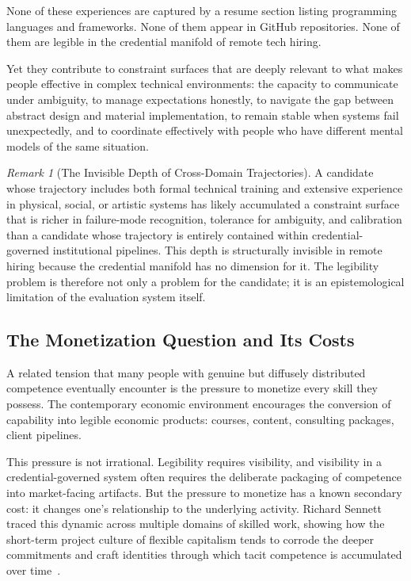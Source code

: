 \documentclass[12pt, a4paper]{article}
\theoremstyle{plain}
\theoremstyle{definition}
\theoremstyle{remark}
\newtheorem{remark}[proposition]{Remark}
\begin{document}
None of these experiences are captured by a resume section
listing programming languages and frameworks.
None of them appear in GitHub repositories.
None of them are legible in the credential manifold of remote tech hiring.

Yet they contribute to constraint surfaces that are deeply relevant
to what makes people effective in complex technical environments:
the capacity to communicate under ambiguity, to manage expectations honestly,
to navigate the gap between abstract design and material implementation,
to remain stable when systems fail unexpectedly, and to coordinate
effectively with people who have different mental models of the same situation.

\begin{remark}[The Invisible Depth of Cross-Domain Trajectories]
A candidate whose trajectory includes both formal technical training
and extensive experience in physical, social, or artistic systems
has likely accumulated a constraint surface that is richer in
failure-mode recognition, tolerance for ambiguity, and calibration
than a candidate whose trajectory is entirely contained within
credential-governed institutional pipelines.
This depth is structurally invisible in remote hiring because
the credential manifold has no dimension for it.
The legibility problem is therefore not only a problem for the candidate;
it is an epistemological limitation of the evaluation system itself.
\end{remark}

\subsection{The Monetization Question and Its Costs}

A related tension that many people with genuine but diffusely distributed competence
eventually encounter is the pressure to monetize every skill they possess.
The contemporary economic environment encourages the conversion of capability
into legible economic products: courses, content, consulting packages, client pipelines.

This pressure is not irrational. Legibility requires visibility,
and visibility in a credential-governed system often requires the deliberate
packaging of competence into market-facing artifacts.
But the pressure to monetize has a known secondary cost:
it changes one's relationship to the underlying activity.
Richard Sennett traced this dynamic across multiple domains of skilled work,
showing how the short-term project culture of flexible capitalism
tends to corrode the deeper commitments and craft identities
through which tacit competence is accumulated over time~\cite{sennett1998}.
\end{document}
